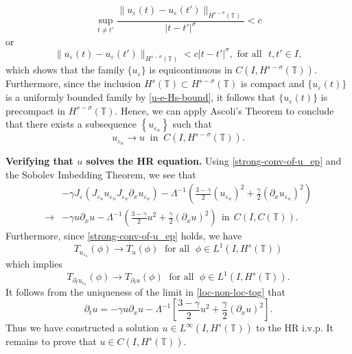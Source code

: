 \documentclass[12pt,reqno]{amsart}
\newcommand{\p}{\partial}
\newcommand{\ci}{\mathbb{T}}
\newcommand{\ee}{\varepsilon}
\theoremstyle{plain}  %
\theoremstyle{definition}
\begin{document}
%
%
%
\begin{equation*}
\label{equic-1}
\sup_{t \neq t'} \frac { \|u_\ee(t) - u_\ee(t') \|_{H^{s -
\sigma}(\ci)}}{|t - t'|^\sigma} < c 
\end{equation*}
%
%
%
or
%
%
%
\begin{equation*}
\label{equic-2}
\|u_\ee(t) - u_\ee(t') \|_{H^{s - \sigma}(\ci)}< c|t - t'|^\sigma, \text{ 
for all }  \,\,  t, t'\in I,
\end{equation*}
%
%
%
%
which shows that the family  $\{u_\ee\}$ is equicontinuous in $C(I, 
H^{s-\sigma}(\ci))$. Furthermore, since the inclusion $H^s(\ci) \subset H^{s-
\sigma }(\ci)$ is compact and 
$\{u_\ee(t)\}$ is a uniformly bounded family by 
\eqref{u-e-Hs-bound}, it follows that
$\{u_\ee(t)\}$ is precompact in 
$H^{s-\sigma}(\ci)$. Hence, we can apply Ascoli's Theorem  
\cite{Dieudonne_1969_Foundations-of-} to conclude that there exists a 
subsequence $\left\{ u_{\ee_n} \right\}$
such that
%
%
\begin{equation}
\label{strong-conv-of-u_ep}
u_{\ee_n} \to u \; \; \text{in} \; \; C(I, H^{s-\sigma}(\ci)).
\end{equation}
%
%
%
%
%
%
%
%
%

{\bf Verifying that $u$ solves the HR equation.} Using 
\eqref{strong-conv-of-u_ep}
and the Sobolev Imbedding Theorem, we see that
%
%
%
%
\begin{equation}
\begin{split}
& -\gamma J_\ee (J_{\ee_n} u_{\ee_n}  J_{\ee_n} \p_x
u_{\ee_n}) - \Lambda^{-1} \left( \frac{3-\gamma}{2}
(u_{\ee_n})^2
+ \frac{\gamma}{2} (\p_x u_{\ee_n})^2 \right )
\\
\to & -\gamma u \p_x u -
\Lambda^{-1} \left( \frac{3-\gamma}{2} u^2
+ \frac{\gamma}{2} (\p_x u)^2 \right ) \ \
\text{in} \ \ C(I, C(\ci)).
\label{loc-non-loc-tog}
\end{split}
\end{equation}
%
%
Furthermore, since \eqref{strong-conv-of-u_ep} holds, we have
%
%
%
\begin{equation}
\label{weak-conv-2}
T_{u_{\ee_n}}(\phi)  \longrightarrow  T_u(\phi) \;
\text{ for all } \;  \phi \in L^1(I, H^{s}(\ci))
\end{equation}
%
%
%
which implies
%
%
%
%
\begin{equation}
\label{distib-conv-2}
T_{\p_t u_{\ee_n}}(\phi)  \longrightarrow  T_{\p_t u}(\phi) \;
\text{ for all } \;  \phi \in L^1(I, H^{s}(\ci)).
\end{equation}
%
%
%
%
It follows from the uniqueness of the limit in \eqref{loc-non-loc-tog}
that
%
%
%
\begin{equation}
\label{1000y}
\partial_t u =- \gamma u \partial_x u- \Lambda^{-1} \left
[\frac{3-\gamma}{2}u^2 + \frac{\gamma}{2}(\p_x u)^2 \right ].
\end{equation}
%
%
%
Thus we have constructed a solution $u \in L^\infty(I, H^s(\ci))$
to the HR i.v.p. It remains to prove that $u \in C(I, H^s(\ci)).$
%
%
%
%
%
\end{document}
